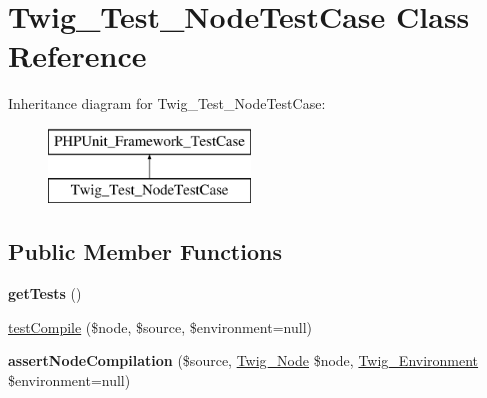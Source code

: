 \hypertarget{class_twig___test___node_test_case}{}\section{Twig\+\_\+\+Test\+\_\+\+Node\+Test\+Case Class Reference}
\label{class_twig___test___node_test_case}
Inheritance diagram for Twig\+\_\+\+Test\+\_\+\+Node\+Test\+Case\+:\begin{figure}[H]
\begin{center}
\leavevmode
\includegraphics[height=2.000000cm]{class_twig___test___node_test_case}
\end{center}
\end{figure}
\subsection*{Public Member Functions}
\begin{DoxyCompactItemize}
\item 
\hypertarget{class_twig___test___node_test_case_a7e247dd31cc8d37a6c97353a062a0080}{}{\bfseries get\+Tests} ()\label{class_twig___test___node_test_case_a7e247dd31cc8d37a6c97353a062a0080}

\item 
\hyperlink{class_twig___test___node_test_case_af004df5265878ab342a6e824127a5940}{test\+Compile} (\$node, \$source, \$environment=null)
\item 
\hypertarget{class_twig___test___node_test_case_ac05bcadc386dd4d55d19159043845a68}{}{\bfseries assert\+Node\+Compilation} (\$source, \hyperlink{class_twig___node}{Twig\+\_\+\+Node} \$node, \hyperlink{class_twig___environment}{Twig\+\_\+\+Environment} \$environment=null)\label{class_twig___test___node_test_case_ac05bcadc386dd4d55d19159043845a68}

\end{DoxyCompactItemize}

